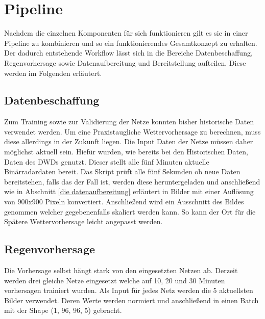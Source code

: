 \section{Pipeline}\label{sec: Pipeline}
Nachdem die einzelnen Komponenten für sich funktionieren gilt es sie in einer Pipeline zu kombinieren und so ein funktionierendes Gesamtkonzept zu erhalten.
Der dadurch entstehende Workflow lässt sich in die Bereiche Datenbeschaffung, Regenvorhersage sowie Datenaufbereitung und Bereitstellung aufteilen.
Diese werden im Folgenden erläutert.

\subsection{Datenbeschaffung}
Zum Training sowie zur Validierung der Netze konnten bisher historische Daten verwendet werden.
Um eine Praxistaugliche Wettervorhersage zu berechnen, muss diese allerdings in der Zukunft liegen.
Die Input Daten der Netze müssen daher möglichst aktuell sein.
Hiefür wurden, wie bereits bei den Historischen Daten, Daten des DWDs genutzt.
Dieser stellt alle fünf Minuten aktuelle Binärradardaten bereit.
Das Skript prüft alle fünf Sekunden ob neue Daten bereitstehen, falls das der Fall ist, werden diese heruntergeladen und anschließend wie in Abschnitt \ref{die datenaufbereitung} erläutert in Bilder mit einer Auflösung von 900x900 Pixeln konvertiert.
Anschließend wird ein Ausschnitt des Bildes genommen welcher gegebenenfalls skaliert werden kann.
So kann der Ort für die Spätere Wettervorhersage leicht angepasst werden.

\subsection{Regenvorhersage}
Die Vorhersage selbst hängt stark von den eingesetzten Netzen ab.
Derzeit werden drei gleiche Netze eingesetzt welche auf 10, 20 und 30 Minuten vorhersagen trainiert wurden.
Als Input für jedes Netz werden die 5 aktuellsten Bilder verwendet.
Deren Werte werden normiert und anschließend in einen Batch mit der Shape (1, 96, 96, 5) gebracht.

